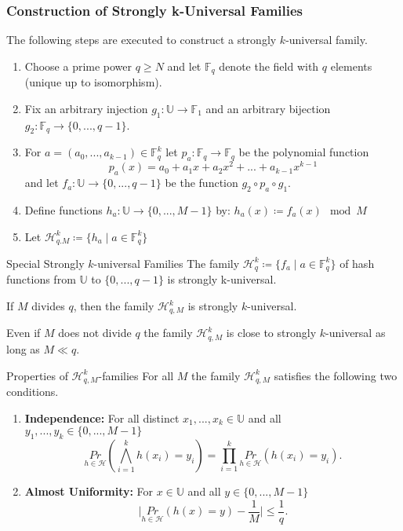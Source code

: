 \documentclass[english]{panikzettel}
\begin{document}
\subsubsection{Construction of Strongly k-Universal Families}
The following steps are executed to construct a strongly $k$-universal family.
\begin{enumerate}
\item Choose a prime power $q\geq N$ and let $\mathbb{F}_q$ denote the field with $q$ elements (unique up to isomorphism).
\item Fix an arbitrary injection $g_1:\mathbb{U}\to\mathbb{F}_1$ and an arbitrary bijection $g_2:\mathbb{F}_q\to \{0,...,q-1 \}$.
\item For $a=(a_0,...,a_{k-1})\in\mathbb{F}_q^k$ let $p_a:\mathbb{F}_q\to \mathbb{F}_q$ be the polynomial function
\[
p_a(x)=a_0+a_1x+a_2x^2+...+a_{k-1}x^{k-1}
\]
and let $f_a:\mathbb{U}\to \{0,...,q-1 \}$ be the function $g_2\circ p_a\circ g_1$.
\item Define functions $h_a:\mathbb{U}\to \{0,...,M-1\}$ by: $h_a(x)\coloneqq f_a(x) \mod M$
\item Let $\mathcal{H}_{q.M}^k\coloneqq \{h_a\mid a\in \mathbb{F}_q^k \}$
\end{enumerate}


\begin{theo}{Special Strongly $k$-universal Families}
The family $\mathcal{H}_q^k\coloneqq \{f_a\mid a\in \mathbb{F}_q^k \}$ of hash functions from $\mathbb{U}$ to $\{0,...,q-1 \}$ is strongly k-universal.

If $M$ divides $q$, then the family $\mathcal{H}_{q,M}^k$ is strongly $k$-universal.
\end{theo}


Even if $M$ does not divide $q$ the family $\mathcal{H}_{q,M}^k$ is close to strongly $k$-universal as long as $M\ll q$.

\begin{theo}{Properties of $\mathcal{H}_{q,M}^k$-families}
For all $M$ the family $\mathcal{H}_{q,M}^k$ satisfies the following two conditions.
\begin{enumerate}
\item \textbf{Independence:} For all distinct $x_1,...,x_k\in\mathbb{U}$ and all $y_1,...,y_k\in\{0,...,M-1 \}$
\[
\underset{h\in\mathcal{H}}{Pr}\left( \bigwedge_{i=1}^k h(x_i)=y_i \right) = \prod_{i=1}^k \underset{h\in\mathcal{H}}{Pr}(h(x_i)=y_i).
\]
\item \textbf{Almost Uniformity:} For $x\in\mathbb{U}$ and all $y\in\{0,...,M-1 \}$
\[
\bigg|\underset{h\in\mathcal{H}}{Pr} (h(x)=y)-\frac{1}{M}\bigg|\leq \frac{1}{q}.
\]
\end{enumerate}
\end{theo}
\end{document}
